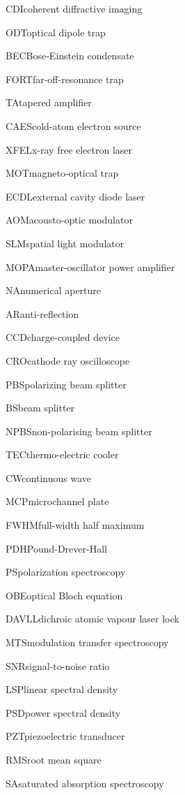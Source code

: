    {CDI}{coherent diffractive imaging}

    {ODT}{optical dipole trap}

    {BEC}{Bose-Einstein condensate}

    {FORT}{far-off-resonance trap}

    {TA}{tapered amplifier}

    {CAES}{cold-atom electron source}

    {XFEL}{x-ray free electron laser}

    {MOT}{magneto-optical trap}

    {ECDL}{external cavity diode laser}

    {AOM}{acousto-optic modulator}

    {SLM}{spatial light modulator}

    {MOPA}{master-oscillator power amplifier}

    {NA}{numerical aperture}

    {AR}{anti-reflection}

    {CCD}{charge-coupled device}

    {CRO}{cathode ray oscilloscope}

    {PBS}{polarizing beam splitter}

    {BS}{beam splitter}

    {NPBS}{non-polarising beam splitter}

    {TEC}{thermo-electric cooler}

    {CW}{continuous wave}

    {MCP}{microchannel plate}

    {FWHM}{full-width half maximum}

    {PDH}{Pound-Drever-Hall}
    
    {PS}{polarization spectroscopy}
    
    {OBE}{optical Bloch equation}
    
    {DAVLL}{dichroic atomic vapour laser lock}

    {MTS}{modulation transfer spectroscopy}

    {SNR}{signal-to-noise ratio}

    {LSP}{linear spectral density}
    
    {PSD}{power spectral density}
    
    {PZT}{piezoelectric transducer}

    {RMS}{root mean square}
    
    {SA}{saturated absorption spectroscopy}
    
